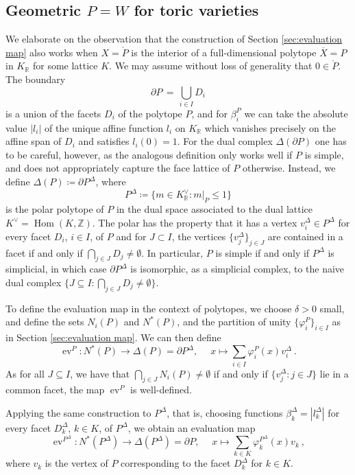 \documentclass[11pt, a4paper]{amsart}
\theoremstyle{definition}
\theoremstyle{myitemstyle}
\newcommand{\R}{\mathbb{R}}
\newcommand{\Z}{\mathbb{Z}}
\DeclareMathOperator{\Hom}{Hom}
\DeclareMathOperator{\ev}{ev}
\newcommand{\equ}{\ensuremath{\,=\,}}
\begin{document}
\subsection{Geometric $P=W$ for toric  varieties}
\label{sec:evaluation map polytopes}
We elaborate on the observation that the construction of Section \ref{sec:evaluation map} also works when $X=\mathring{P}$ is the interior of a full-dimensional polytope $\overline X=P$ in $K_\R$ for some lattice $K$. We may assume  without loss of generality  that $0\in \mathring P$. The boundary 
\[
\partial P \equ \bigcup_{i\in I} D_i
\]
is a union of the facets $D_i$ of the polytope $P$, and for $\beta^P_i$ we can take the absolute value $|l_i|$ of the unique affine function $l_i$ on $K_\R$ which vanishes precisely on the affine span of $D_i$ and satisfies $l_i(0)=1$.
For the dual complex $\Delta(\partial P)$ one has to be careful, however, as the analogous definition only works well if $P$ is simple, and does not appropriately capture the face lattice of $P$ otherwise. Instead, we define $\Delta(P)\coloneqq \partial P^\Delta$, where
\[
P^\Delta\coloneqq \{m\in K^\vee_\R : m|_P\leq 1\}
\]
is the polar polytope of $P$ in the dual space associated to the dual lattice $K^\vee=\Hom(K,\Z)$. The polar has the property that it has a vertex $v_i^\Delta\in P^\Delta$ for every facet $D_i$, $i\in I$, of $P$ and for $J\subset I$, the vertices $\{v_j^\Delta\}_{j\in J}$ are contained in a facet if and only if $\bigcap_{j\in J}D_j\neq \emptyset$. In particular, $P$ is simple if and only if $P^\Delta$ is simplicial, in which case $\partial P^\Delta$ is isomorphic, as a simplicial complex, to the naive dual complex $\{J\subseteq I : \bigcap_{j\in J}D_j\neq \emptyset\}$. 

To define the evaluation map in the context of polytopes, we choose $\delta>0$ small, and define the sets $N_i(P)$ and $N^*(P)$, and the partition of unity $\{\varphi_i^P\}_{i\in I}$ as in Section \ref{sec:evaluation map}. We can then define 
\[
    \ev^P\colon N^*(P)\to \Delta(P)=\partial P^\Delta,\;\quad x\mapsto \sum_{i\in I}\varphi_i^P(x) v^\Delta_i \ .
\]
As for all $J\subseteq I$, we have that  $\bigcap_{j\in J} N_i(P)\neq \emptyset$ if and only if $\{v_j^{\Delta}: j\in J\}$ lie in a common facet, the map $\ev^P$ is well-defined.

Applying the same construction to $P^\Delta$, that is, choosing functions $\beta^{\Delta}_k=| l^{\Delta}_k|$ for every facet $D_k^\Delta$, $k\in K$, of $P^\Delta$, we obtain an evaluation map
\[
    \ev^{P^\Delta}\colon N^*(P^\Delta)\to \Delta(P^\Delta)=\partial P, \;\quad x\mapsto \sum_{k \in K}\varphi_k^{P^\Delta}(x)v_k\ ,
\]
where $v_k$ is the vertex of $P$ corresponding to the facet $D_k^\Delta$ for $k\in K$.
\end{document}
